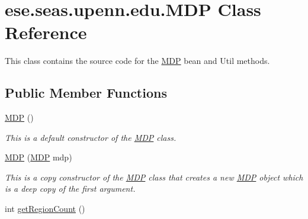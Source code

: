 \hypertarget{classese_1_1seas_1_1upenn_1_1edu_1_1_m_d_p}{}\section{ese.\+seas.\+upenn.\+edu.\+M\+D\+P Class Reference}
\label{classese_1_1seas_1_1upenn_1_1edu_1_1_m_d_p}


This class contains the source code for the \hyperlink{classese_1_1seas_1_1upenn_1_1edu_1_1_m_d_p}{M\+D\+P} bean and Util methods.  


\subsection*{Public Member Functions}
\begin{DoxyCompactItemize}
\item 
\hypertarget{classese_1_1seas_1_1upenn_1_1edu_1_1_m_d_p_af840f71801e34c9236b26a05e3633eb6}{}\hyperlink{classese_1_1seas_1_1upenn_1_1edu_1_1_m_d_p_af840f71801e34c9236b26a05e3633eb6}{M\+D\+P} ()\label{classese_1_1seas_1_1upenn_1_1edu_1_1_m_d_p_af840f71801e34c9236b26a05e3633eb6}

\begin{DoxyCompactList}\small\item\em This is a default constructor of the \hyperlink{classese_1_1seas_1_1upenn_1_1edu_1_1_m_d_p}{M\+D\+P} class. \end{DoxyCompactList}\item 
\hypertarget{classese_1_1seas_1_1upenn_1_1edu_1_1_m_d_p_aa2256090843c2276d839069d590dbcde}{}\hyperlink{classese_1_1seas_1_1upenn_1_1edu_1_1_m_d_p_aa2256090843c2276d839069d590dbcde}{M\+D\+P} (\hyperlink{classese_1_1seas_1_1upenn_1_1edu_1_1_m_d_p}{M\+D\+P} mdp)\label{classese_1_1seas_1_1upenn_1_1edu_1_1_m_d_p_aa2256090843c2276d839069d590dbcde}

\begin{DoxyCompactList}\small\item\em This is a copy constructor of the \hyperlink{classese_1_1seas_1_1upenn_1_1edu_1_1_m_d_p}{M\+D\+P} class that creates a new \hyperlink{classese_1_1seas_1_1upenn_1_1edu_1_1_m_d_p}{M\+D\+P} object which is a deep copy of the first argument. \end{DoxyCompactList}\item 
\hypertarget{classese_1_1seas_1_1upenn_1_1edu_1_1_m_d_p_ae39dcfbf933f2e5f390851e1a81c06af}{}int \hyperlink{classese_1_1seas_1_1upenn_1_1edu_1_1_m_d_p_ae39dcfbf933f2e5f390851e1a81c06af}{get\+Region\+Count} ()\label{classese_1_1seas_1_1upenn_1_1edu_1_1_m_d_p_ae39dcfbf933f2e5f390851e1a81c06af}


\end{DoxyCompactItemize}
